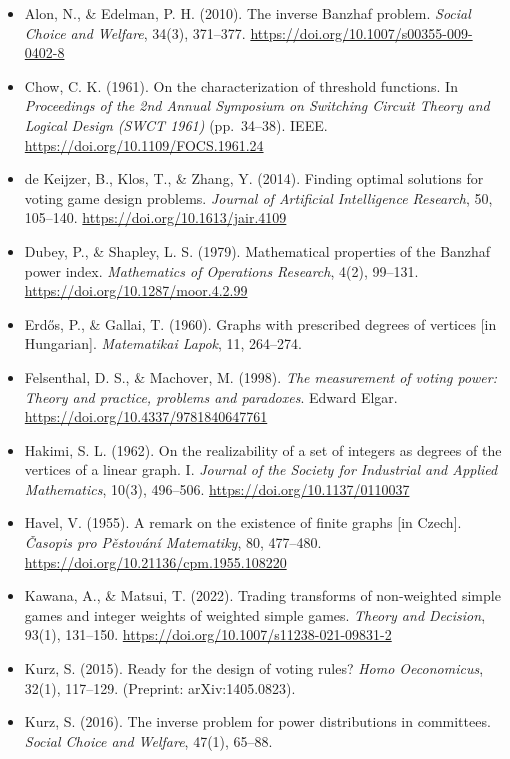\documentclass[
]{article}
\providecommand{\tightlist}{%
  \setlength{\itemsep}{0pt}\setlength{\parskip}{0pt}}
\begin{document}
\begin{itemize}
\tightlist
\item
  Alon, N., \& Edelman, P. H. (2010). The inverse Banzhaf problem.
  \emph{Social Choice and Welfare}, 34(3), 371--377.
  \url{https://doi.org/10.1007/s00355-009-0402-8}
\item
  Chow, C. K. (1961). On the characterization of threshold functions. In
  \emph{Proceedings of the 2nd Annual Symposium on Switching Circuit
  Theory and Logical Design (SWCT 1961)} (pp.~34--38). IEEE.
  \url{https://doi.org/10.1109/FOCS.1961.24}
\item
  de Keijzer, B., Klos, T., \& Zhang, Y. (2014). Finding optimal
  solutions for voting game design problems. \emph{Journal of Artificial
  Intelligence Research}, 50, 105--140.
  \url{https://doi.org/10.1613/jair.4109}
\item
  Dubey, P., \& Shapley, L. S. (1979). Mathematical properties of the
  Banzhaf power index. \emph{Mathematics of Operations Research}, 4(2),
  99--131. \url{https://doi.org/10.1287/moor.4.2.99}
\item
  Erdős, P., \& Gallai, T. (1960). Graphs with prescribed degrees of
  vertices {[}in Hungarian{]}. \emph{Matematikai Lapok}, 11, 264--274.
\item
  Felsenthal, D. S., \& Machover, M. (1998). \emph{The measurement of
  voting power: Theory and practice, problems and paradoxes}. Edward
  Elgar. \url{https://doi.org/10.4337/9781840647761}
\item
  Hakimi, S. L. (1962). On the realizability of a set of integers as
  degrees of the vertices of a linear graph. I. \emph{Journal of the
  Society for Industrial and Applied Mathematics}, 10(3), 496--506.
  \url{https://doi.org/10.1137/0110037}
\item
  Havel, V. (1955). A remark on the existence of finite graphs {[}in
  Czech{]}. \emph{Časopis pro Pěstování Matematiky}, 80, 477--480.
  \url{https://doi.org/10.21136/cpm.1955.108220}
\item
  Kawana, A., \& Matsui, T. (2022). Trading transforms of non-weighted
  simple games and integer weights of weighted simple games.
  \emph{Theory and Decision}, 93(1), 131--150.
  \url{https://doi.org/10.1007/s11238-021-09831-2}
\item
  Kurz, S. (2015). Ready for the design of voting rules? \emph{Homo
  Oeconomicus}, 32(1), 117--129. (Preprint: arXiv:1405.0823).
\item
  Kurz, S. (2016). The inverse problem for power distributions in
  committees. \emph{Social Choice and Welfare}, 47(1), 65--88.

\end{itemize}
\end{document}

